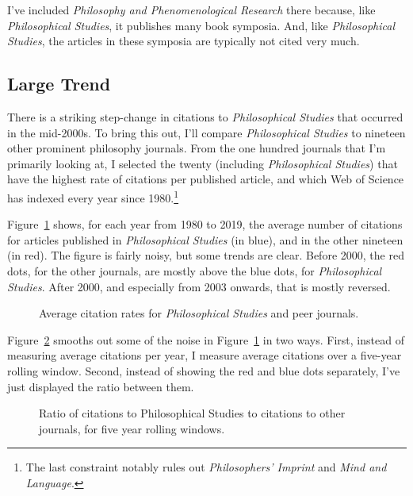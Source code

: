 \documentclass[
  10pt,
  letterpaper,
  DIV=11,
  numbers=noendperiod,
  twoside]{scrartcl}
\begin{document}
I've included \emph{Philosophy and Phenomenological Research} there
because, like \emph{Philosophical Studies}, it publishes many book
symposia. And, like \emph{Philosophical Studies}, the articles in these
symposia are typically not cited very much.

\subsection{Large Trend}\label{sec-large-trend}

There is a striking step-change in citations to \emph{Philosophical
Studies} that occurred in the mid-2000s. To bring this out, I'll compare
\emph{Philosophical Studies} to nineteen other prominent philosophy
journals. From the one hundred journals that I'm primarily looking at, I
selected the twenty (including \emph{Philosophical Studies}) that have
the highest rate of citations per published article, and which Web of
Science has indexed every year since 1980.\footnote{The last constraint
  notably rules out \emph{Philosophers' Imprint} and \emph{Mind and
  Language}.}

Figure~\ref{fig-compare-cites-dots} shows, for each year from 1980 to
2019, the average number of citations for articles published in
\emph{Philosophical Studies} (in blue), and in the other nineteen (in
red). The figure is fairly noisy, but some trends are clear. Before
2000, the red dots, for the other journals, are mostly above the blue
dots, for \emph{Philosophical Studies}. After 2000, and especially from
2003 onwards, that is mostly reversed.

\begin{figure}


\caption{\label{fig-compare-cites-dots}Average citation rates for
\emph{Philosophical Studies} and peer journals.}

\end{figure}%

Figure~\ref{fig-compare-cites-rolling} smooths out some of the noise in
Figure~\ref{fig-compare-cites-dots} in two ways. First, instead of
measuring average citations per year, I measure average citations over a
five-year rolling window. Second, instead of showing the red and blue
dots separately, I've just displayed the ratio between them.

\begin{figure}


\caption{\label{fig-compare-cites-rolling}Ratio of citations to
Philosophical Studies to citations to other journals, for five year
rolling windows.}

\end{figure}%
\end{document}
